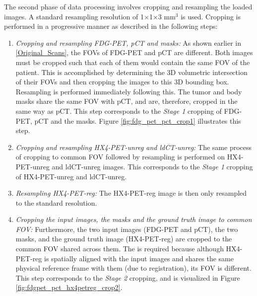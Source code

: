 The second phase of data processing involves cropping and resampling the loaded images. A standard resampling resolution of 1$\times$1$\times$3 mm$^3$ is used. Cropping is performed in a progressive manner as described in the following steps: 

\begin{enumerate}
    \item \textit{Cropping and resampling FDG-PET, pCT and masks:} As shown earlier in \ref{Original_Scans}, the FOVs of FDG-PET and pCT are different. Both images must be cropped such that each of them would contain the same FOV of the patient. This is accomplished by determining the 3D volumetric intersection of their FOVs and then cropping the images to this 3D bounding box. Resampling is performed immediately following this. The tumor and body masks share the same FOV with pCT, and are, therefore, cropped in the same way as pCT. This step corresponds to the \textit{Stage 1} cropping of FDG-PET, pCT and the masks. Figure \ref{fig:fdg_pet_pct_crop1} illustrates this step.

    \item \textit{Cropping and resampling HX4-PET-unreg and ldCT-unreg:} The same process of cropping to common FOV followed by resampling is performed on HX4-PET-unreg and ldCT-unreg images. This corresponds to the \textit{Stage 1} cropping of HX4-PET-unreg and ldCT-unreg.

    \item \textit{Resampling HX4-PET-reg:} The HX4-PET-reg image is then only resampled to the standard resolution.

    \item \textit{Cropping the input images, the masks and the ground truth image to common FOV:} Furthermore, the two input images (FDG-PET and pCT), the two masks, and the ground truth image (HX4-PET-reg) are cropped to the common FOV shared across them. The is required because although HX4-PET-reg is spatially aligned with the input images and shares the same physical reference frame with them (due to registration), its FOV is different. This step corresponds to the \textit{Stage 2} cropping, and is visualized in Figure \ref{fig:fdgpet_pct_hx4petreg_crop2}.
\end{enumerate}

